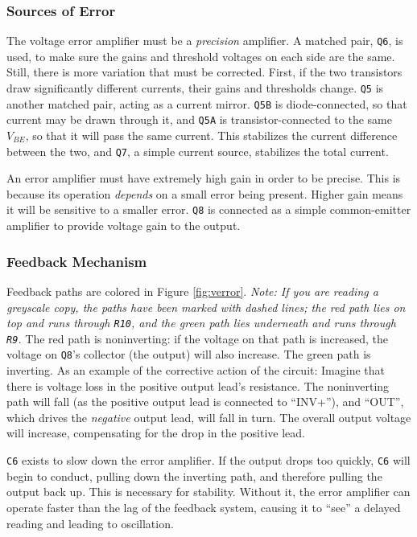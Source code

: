 \begin{multicols}{2}
\subsubsection{Sources of Error}
The voltage error amplifier must be a \emph{precision} amplifier. 
A matched pair, \texttt{Q6}, is used, to make sure the gains and
threshold voltages on each side are the same. Still, there is more variation
that must be corrected. First, if the two transistors draw significantly
different currents, their gains and thresholds change. \texttt{Q5} is another
matched pair, acting as a current mirror. \texttt{Q5B} is diode-connected,
so that current may be drawn through it, and \texttt{Q5A} is
transistor-connected to the same $V_{BE}$, so that it will pass the same
current. This stabilizes the current difference between the two, and
\texttt{Q7}, a simple current source, stabilizes the total current.

An error amplifier must have extremely high gain in order to be precise.
This is because its operation \emph{depends} on a small error being present.
Higher gain means it will be sensitive to a smaller error.
\texttt{Q8} is connected as a simple common-emitter amplifier
to provide voltage gain to the output.

\subsubsection{Feedback Mechanism}
Feedback paths are colored in Figure \ref{fig:verror}. 
{\small \it Note: If you are reading a
greyscale copy, the paths have been marked with dashed lines; the red path
lies on top and runs through \texttt{R10}, and the green path lies underneath
and runs through \texttt{R9}.}
The red path is
noninverting: if the voltage on that path is increased, the voltage on
\texttt{Q8}'s collector (the output) will also increase. The green path
is inverting. As an example of the corrective action of the circuit: Imagine
that there
is voltage loss in the positive output lead's resistance.
The noninverting path will fall (as the positive output lead is connected
to ``INV+''),
and ``OUT'', which drives the \emph{negative}
output lead, will fall in turn. The overall output voltage will increase,
compensating for the drop in the positive lead.

\texttt{C6} exists to slow down the error amplifier. If the output drops
too quickly, \texttt{C6} will begin to conduct, pulling down the inverting
path, and therefore pulling the output back up. This is necessary for
stability. Without it, the error amplifier can operate faster than the
lag of the feedback system, causing it to ``see'' a delayed reading and
leading to oscillation.


\end{multicols}
